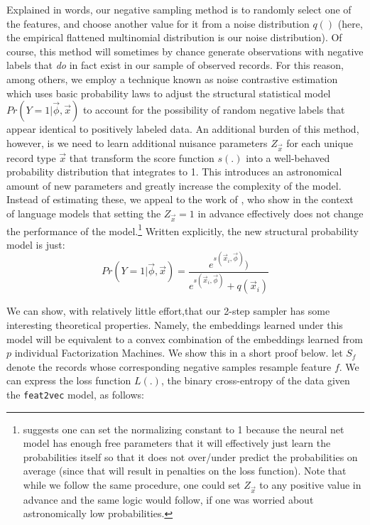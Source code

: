\documentclass{article}
\begin{document}
Explained in words, our negative sampling method is to randomly select one of the features, and choose another value for it from a noise distribution $q()$ (here, the empirical flattened multinomial distribution is our noise distribution). Of course, this method will sometimes by chance generate observations with negative labels that \textit{do} in fact exist in our sample of observed records. For this reason, among others, we employ  a technique known as noise contrastive estimation\cite{nce} which uses basic probability laws to adjust the structural statistical model $Pr(Y=1|\vec{\phi},\vec{x})$ to account for the possibility of random negative labels that appear identical to positively labeled data. An additional burden of this method, however, is we need to learn additional nuisance parameters $Z_{\vec{x}}$ for each unique record type $\vec{x}$ that transform the score function $s(.)$ into a well-behaved probability distribution that integrates to 1. This introduces an astronomical amount of new parameters and greatly increase the complexity of the model. Instead of estimating these, we appeal to the work of \cite{fastnnlang}, who show in the context of language models that setting the $Z_{\vec{x}}=1$ in advance effectively does not change the performance of the model.\footnote{\cite{fastnnlang} suggests one can set the normalizing constant to 1 because the neural net model has enough free parameters that it will effectively just learn the probabilities itself so that it does not over/under predict the probabilities on average (since that will result in penalties on the loss function). Note that while we follow the same procedure, one could set $Z_{\vec{x}}$ to any positive value in advance and the same logic would follow, if one was worried about astronomically low probabilities.}  Written explicitly, the new structural probability model is just:
\[Pr(Y=1|\vec{\phi},\vec{x}) = \frac{e^{s(\vec{x}_i,\vec{\phi}) })}{e^{s(\vec{x}_i,\vec{\phi}) } + q(\vec{x}_i) }\]

We can show, with relatively little effort,that our 2-step sampler has some interesting theoretical properties. Namely, the embeddings learned under this model will be equivalent to a convex combination of the embeddings learned from $p$ individual Factorization Machines. We show this in a short proof below. let $S_f$ denote the records whose corresponding negative samples resample feature $f$. We can express the loss function $L(.)$, the binary cross-entropy of the data given the \texttt{feat2vec} model, as follows:
\end{document}
